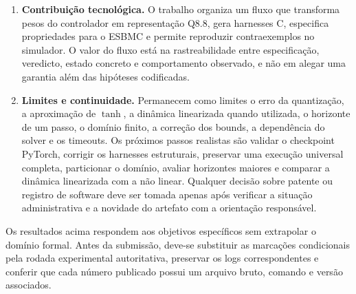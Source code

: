 \begin{enumerate}
  \item \textbf{Contribuição tecnológica.} O trabalho organiza um fluxo que
  transforma pesos do controlador em representação Q8.8, gera harnesses C,
  especifica propriedades para o ESBMC e permite reproduzir contraexemplos no
  simulador. O valor do fluxo está na rastreabilidade entre especificação,
  veredicto, estado concreto e comportamento observado, e não em alegar uma
  garantia além das hipóteses codificadas.

  \item \textbf{Limites e continuidade.} Permanecem como limites o erro da
  quantização, a aproximação de $\tanh$, a dinâmica linearizada quando utilizada,
  o horizonte de um passo, o domínio finito, a correção dos bounds, a dependência
  do solver e os timeouts. Os próximos passos realistas são validar o checkpoint
  PyTorch, corrigir os harnesses estruturais, preservar uma execução universal
  completa, particionar o domínio, avaliar horizontes maiores e comparar a
  dinâmica linearizada com a não linear. Qualquer decisão sobre patente ou
  registro de software deve ser tomada apenas após verificar a situação
  administrativa e a novidade do artefato com a orientação responsável.
\end{enumerate}

Os resultados acima respondem aos objetivos específicos sem extrapolar o domínio
formal. Antes da submissão, deve-se substituir as marcações condicionais pela
rodada experimental autoritativa, preservar os logs correspondentes e conferir
que cada número publicado possui um arquivo bruto, comando e versão associados.
